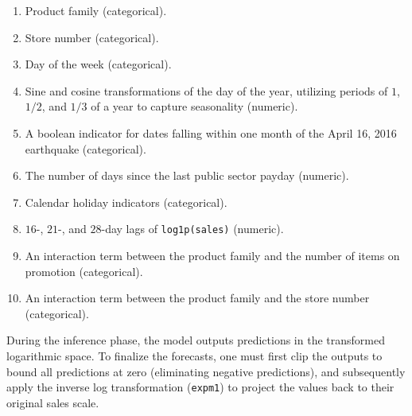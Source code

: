 \documentclass{article}
\begin{document}
\begin{enumerate}
    \item Product family (categorical).
    \item Store number (categorical).
    \item Day of the week (categorical).
    \item Sine and cosine transformations of the day of the year, utilizing periods of $1$, $1/2$, and $1/3$ of a year to capture seasonality (numeric).
    \item A boolean indicator for dates falling within one month of the April 16, 2016 earthquake (categorical).
    \item The number of days since the last public sector payday (numeric).
    \item Calendar holiday indicators (categorical).
    \item $16$-, $21$-, and $28$-day lags of \texttt{log1p(sales)} (numeric).
    \item An interaction term between the product family and the number of items on promotion (categorical).
    \item An interaction term between the product family and the store number (categorical).
\end{enumerate}

During the inference phase, the model outputs predictions in the transformed logarithmic space. To finalize the forecasts, one must first clip the outputs to bound all predictions at zero (eliminating negative predictions), and subsequently apply the inverse log transformation (\texttt{expm1}) to project the values back to their original sales scale.
\end{document}
